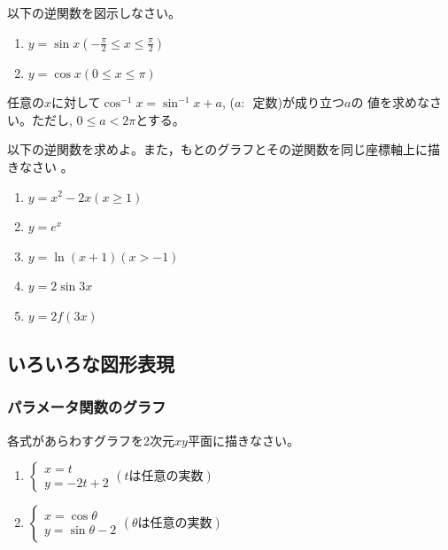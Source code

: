\documentclass[twocolumn,11pt]{jarticle}
\begin{document}
\nquestion
以下の逆関数を図示しなさい。
\begin{enumerate}
\item $y=\sin x$\quad $\displaystyle(-\frac{\pi}{2}\le x \le\frac{\pi}{2})$
\item $y=\cos x$\quad $\displaystyle(0\le x \le \pi)$
\end{enumerate}

\nquestion
任意の$x$に対して$\cos^{-1}x=\sin^{-1}x+a$, ($a:$~定数)が成り立つ$a$の
値を求めなさい。ただし, $0\le a<2\pi$とする。

\nquestion
以下の逆関数を求めよ。また，もとのグラフとその逆関数を同じ座標軸上に描
きなさい
。
\begin{enumerate}
\item\label{item:inv(xx-2x)} $y=x^2-2x$\quad $(x \geq 1)$
\item\label{item:inv(expx)} $y=e^x$
\item\label{item:inv(ln(x+1))} $y=\ln (x+1)$\quad$(x>-1)$
\item\label{item:inv(2sin3x)} $y=2\sin 3x$
\item\label{item:inv(2f(3x))} $y=2f(3x)$
\end{enumerate}

\subsection{いろいろな図形表現}
\subsubsection{パラメータ関数のグラフ}

\question
各式があらわすグラフを2次元$xy$平面に描きなさい。
\begin{enumerate}
\item
$    \begin{cases}
      x=t\\
      y=-2t+2
    \end{cases}(t\mbox{は任意の実数})$
\item
$    \begin{cases}
      x=\cos\theta\\
      y=\sin\theta -2
    \end{cases}(\theta\mbox{は任意の実数})$
\end{enumerate}
\end{document}
